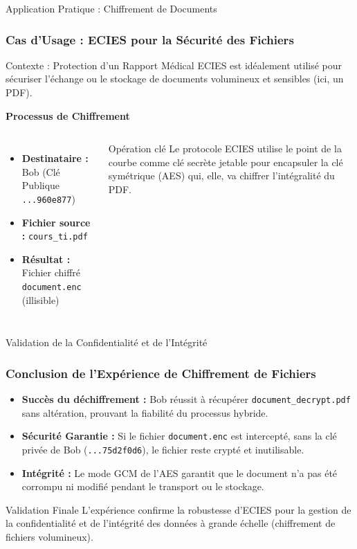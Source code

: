 \begin{frame}{Application Pratique : Chiffrement de Documents}
\frametitle{Cas d'Usage : ECIES pour la Sécurité des Fichiers}

\begin{block}{Contexte : Protection d'un Rapport Médical}
    ECIES est idéalement utilisé pour sécuriser l'échange ou le stockage de documents volumineux et sensibles (ici, un PDF).
\end{block}

\textbf{Processus de Chiffrement}
\begin{columns}
    \begin{itemize}
        \item \textbf{Destinataire :} Bob (Clé Publique \texttt{...960e877})
        \item \textbf{Fichier source :} \texttt{cours\_ti.pdf}
        \item \textbf{Résultat :} Fichier chiffré \texttt{document.enc} (illisible)
    \end{itemize}
    \begin{alertblock}{Opération clé}
        Le protocole ECIES utilise le point de la courbe comme clé secrète jetable pour encapsuler la clé symétrique (AES) qui, elle, va chiffrer l'intégralité du PDF.
    \end{alertblock}
\end{columns}
\end{frame}

\begin{frame}{Validation de la Confidentialité et de l'Intégrité}
\frametitle{Conclusion de l'Expérience de Chiffrement de Fichiers}

\begin{itemize}
    \item \textbf{Succès du déchiffrement :} Bob réussit à récupérer \texttt{document\_decrypt.pdf} sans altération, prouvant la fiabilité du processus hybride.
    \item \textbf{Sécurité Garantie :} Si le fichier \texttt{document.enc} est intercepté, sans la clé privée de Bob (\texttt{...75d2f0d6}), le fichier reste crypté et inutilisable.
    \item \textbf{Intégrité :} Le mode GCM de l'AES garantit que le document n'a pas été corrompu ni modifié pendant le transport ou le stockage.
\end{itemize}

\begin{alertblock}{Validation Finale}
    L'expérience confirme la robustesse d'ECIES pour la gestion de la confidentialité et de l'intégrité des données à grande échelle (chiffrement de fichiers volumineux).
\end{alertblock}
\end{frame}